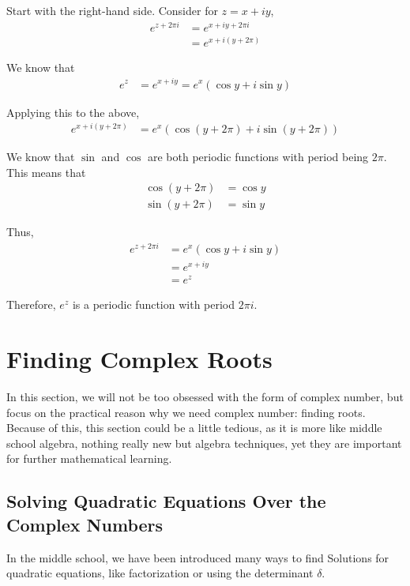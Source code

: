 \documentclass[
	12pt, %
	fleqn, %
	a4paper, %
]{LegrandOrangeBook}
\begin{document}
Start with the right-hand side. Consider for \( z = x + iy \),
\begin{align*}
e^{z+2\pi i} &= e^{x+iy+2\pi i} \\
&= e^{x+i(y+2\pi)}
\end{align*}

We know that
\begin{align*}
e^z &= e^{x+iy} = e^x(\cos y + i \sin y)
\end{align*}

Applying this to the above,
\begin{align*}
e^{x+i(y+2\pi)} &= e^x(\cos(y + 2\pi) + i \sin(y + 2\pi))
\end{align*}

We know that \(\sin\) and \(\cos\) are both periodic functions with period being \(2\pi\). This means that
\begin{align*}
\cos(y + 2\pi) &= \cos y \\
\sin(y + 2\pi) &= \sin y
\end{align*}

Thus,
\begin{align*}
e^{z+2\pi i} &= e^x(\cos y + i \sin y) \\
&= e^{x+iy} \\
&= e^z
\end{align*}

Therefore, \( e^z \) is a periodic function with period \( 2\pi i \).

\section{Finding Complex Roots}
In this section, we will not be too obsessed with the form of complex number, but focus on the practical reason
why we need complex number: finding roots. Because of this, this section could be a little tedious, as it is more
like middle school algebra, nothing really new but algebra techniques, yet they are important for further mathematical learning. 
\subsection{Solving Quadratic Equations Over the Complex Numbers}
In the middle school, we have been introduced many ways to find Solutions for quadratic equations, like factorization or using
the determinant $\delta$.
\end{document}
